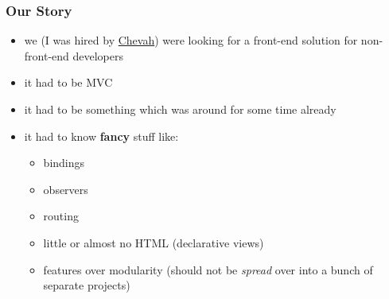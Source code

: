 \documentclass[compress]{beamer}
\begin{document}
\begin{frame}
\frametitle{Our Story}

\hypertarget{why}{}

\begin{itemize}[<+->]
  \item we (I was hired by \href{https://github.com/chevah}{Chevah}) were looking for a front-end solution for non-front-end developers
  \item it had to be MVC
  \item it had to be something which was around for some time already
  \item it had to know \textbf{fancy} stuff like:
    \begin{itemize}[<+->]
      \item bindings
      \item observers
      \item routing
      \item little or almost no HTML (declarative views)
      \item features over modularity (should not be \emph{spread} over into a bunch of separate projects)
    \end{itemize}
\end{itemize}
\end{frame}
\end{document}
